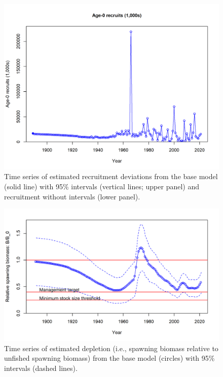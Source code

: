 \documentclass[11pt,
  english,
  a4paper,
]{article}
\begin{document}
\tagmcend\tagstructend


\begin{figure}
\centering
\includegraphics[width=1\textwidth,height=0.5\textheight]{figs/ts11_Age-0_recruits_1000s.png}
\caption{Time series of estimated recruitment deviations from the base model (solid line) with 95\% intervals (vertical lines; upper panel) and recruitment without intervals (lower panel).\label{fig:ts11}}
\end{figure}

\tagmcend\tagstructend

\clearpage


\begin{figure}
\centering
\includegraphics[width=1\textwidth,height=0.7\textheight]{figs/ts9_Relative_spawning_biomass_intervals.png}
\caption{Time series of estimated depletion (i.e., spawning biomass relative to unfished spawning biomass) from the base model (circles) with 95\% intervals (dashed lines).\label{fig:ts9}}
\end{figure}
\end{document}
